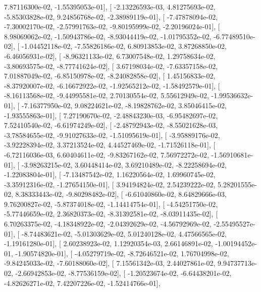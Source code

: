 \documentclass{article}
\begin{document}
          7.87116300e-02,  -1.55395053e-01],
       [ -2.13226593e-03,   4.81275693e-02,  -5.85303828e-02,
          9.24856768e-02,  -2.38989119e-01],
       [ -7.47878094e-02,  -7.30002170e-02,  -2.57991763e-02,
         -9.80195999e-02,  -2.20196024e-01],
       [  8.98069062e-02,  -1.50943786e-02,  -8.93044419e-02,
         -1.01795352e-02,  -6.77489510e-02],
       [ -1.04452118e-02,  -7.55826186e-02,   6.80913853e-02,
          3.87268850e-02,  -6.46056931e-02],
       [ -8.96321133e-02,   6.73007548e-02,   1.29758634e-02,
         -3.80693575e-02,  -8.77741624e-02],
       [  3.67198034e-02,  -7.63357158e-02,   7.01887049e-02,
         -6.85150978e-02,  -8.24082858e-02],
       [  1.45156833e-02,  -8.37920007e-02,  -6.16672922e-02,
         -1.92565212e-02,  -1.58492579e-01],
       [ -8.16113568e-02,  -9.44995581e-02,   2.70130554e-02,
          5.55612949e-02,  -1.99536632e-01],
       [ -7.16377950e-02,   9.08224621e-02,  -8.19828762e-02,
          3.85046415e-02,  -1.93555863e-01],
       [  7.27190670e-02,  -2.48843230e-03,  -6.95482697e-02,
          7.52410540e-02,  -6.61974249e-02],
       [ -2.48792943e-02,  -8.55021628e-03,  -3.78584655e-02,
         -9.91027633e-02,  -1.51095619e-01],
       [ -3.95889176e-02,  -3.92228394e-02,   3.37213524e-02,
          4.44527469e-02,  -1.71526118e-01],
       [ -6.72116036e-03,   6.60404611e-02,  -9.83267162e-02,
          7.56972272e-02,  -1.56910681e-01],
       [ -3.98263215e-02,   3.60448414e-02,   3.69210489e-02,
         -8.22258694e-02,  -1.22083804e-01],
       [ -7.13487542e-02,   1.16220564e-02,   1.69960745e-02,
         -3.35912316e-02,  -1.27654150e-01],
       [  3.94194824e-02,   2.54239222e-02,   5.28201555e-02,
          8.38333443e-02,  -9.80298482e-02],
       [ -6.61040860e-02,   8.64829666e-03,   9.76200827e-02,
         -5.87374018e-02,  -1.14414754e-01],
       [ -4.54251750e-02,  -5.77446659e-02,   2.36820373e-02,
         -8.31392581e-02,  -8.03911435e-02],
       [  6.70263375e-02,  -4.18348922e-02,  -2.04392629e-02,
         -4.56792969e-02,  -2.55495527e-01],
       [ -8.74483621e-02,  -5.01303629e-02,   5.01240128e-02,
          4.47566565e-02,  -1.19161280e-01],
       [  2.60238923e-02,   1.12920354e-03,   2.66146891e-02,
         -1.00194452e-01,  -1.90574820e-01],
       [ -4.05279719e-02,  -8.72646521e-02,   1.76704998e-02,
         -9.84245033e-02,  -7.60188060e-02],
       [  7.15561342e-03,   2.44027861e-02,   9.94737713e-02,
         -2.66942853e-02,  -8.77536159e-02],
       [ -1.20523674e-02,  -6.64438201e-02,  -4.82626271e-02,
          7.42207226e-02,  -1.52414766e-01],
\end{document}
